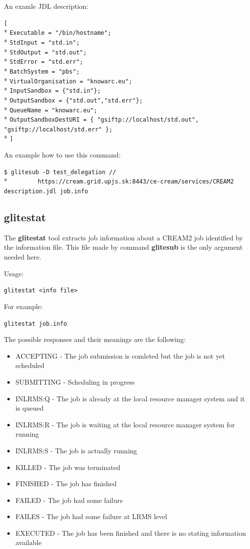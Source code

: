 \documentclass{article}
\begin{document}
An examle JDL description:
\begin{framed}
\verb#[#\\*
\verb#Executable = "/bin/hostname";#\\*
\verb#StdInput = "std.in";#\\*
\verb#StdOutput = "std.out";#\\*
\verb#StdError = "std.err";#\\*
\verb#BatchSystem = "pbs";#\\*
\verb#VirtualOrganisation = "knowarc.eu";#\\*
\verb#InputSandbox = {"std.in"};#\\*
\verb#OutputSandbox = {"std.out","std.err"};#\\*
\verb#QueueName = "knowarc.eu";#\\*
\verb#OutputSandboxDestURI = { "gsiftp://localhost/std.out", "gsiftp://localhost/std.err" };#\\*
\verb#]#
\end{framed}
An example how to use this command:
\begin{shaded}\verb#$ glitesub -D test_delegation //#\\*
\verb#        https://cream.grid.upjs.sk:8443/ce-cream/services/CREAM2 description.jdl job.info#\end{shaded}
\subsection{glitestat}
\label{glitestat}
The \textbf{glitestat} tool extracts job information about a CREAM2 job identified by the information file. This file made by command \textbf{glitesub} is the only argument needed here.\par
Usage:
\begin{shaded}\verb#glitestat <info file>#\end{shaded}
For example:
\begin{shaded}\verb#glitestat job.info#\end{shaded}
The possible responses and their meanings are the following:
\begin{itemize}
\item ACCEPTING - The job submission is comleted but the job is not yet scheduled
\item SUBMITTING - Scheduling in progress
\item INLRMS:Q - The job is already at the local resource manager system and it is queued
\item INLRMS:R - The job is waiting at the local resource manager system for running
\item INLRMS:S - The job is actually running
\item KILLED - The job was terminated
\item FINISHED - The job has finished
\item FAILED - The job had some failure
\item FAILES - The job had some failure at LRMS level
\item EXECUTED - The job has been finished and there is no stating information available
\end{itemize}
\end{document}
